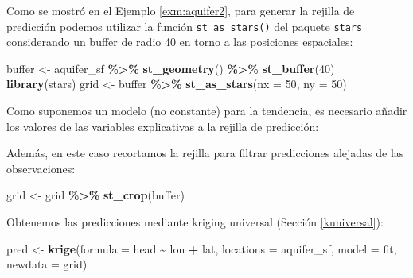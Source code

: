 \documentclass[
]{book}
\newenvironment{Shaded}{\begin{snugshade}}{\end{snugshade}}
\newcommand{\AttributeTok}[1]{\textcolor[rgb]{0.13,0.29,0.53}{#1}}
\newcommand{\DecValTok}[1]{\textcolor[rgb]{0.00,0.00,0.81}{#1}}
\newcommand{\FunctionTok}[1]{\textcolor[rgb]{0.13,0.29,0.53}{\textbf{#1}}}
\newcommand{\NormalTok}[1]{#1}
\newcommand{\OtherTok}[1]{\textcolor[rgb]{0.56,0.35,0.01}{#1}}
\newcommand{\SpecialCharTok}[1]{\textcolor[rgb]{0.81,0.36,0.00}{\textbf{#1}}}
\theoremstyle{break}
\theoremstyle{definition}
\theoremstyle{definition}
\theoremstyle{definition}
\theoremstyle{definition}
\theoremstyle{remark}
\begin{document}
Como se mostró en el Ejemplo \ref{exm:aquifer2}, para generar la rejilla de predicción podemos utilizar la función \texttt{st\_as\_stars()} del paquete \texttt{stars} considerando un buffer de radio 40 en torno a las posiciones espaciales:

\begin{Shaded}
\begin{Highlighting}[]
\NormalTok{buffer }\OtherTok{\textless{}{-}}\NormalTok{ aquifer\_sf }\SpecialCharTok{\%\textgreater{}\%} \FunctionTok{st\_geometry}\NormalTok{() }\SpecialCharTok{\%\textgreater{}\%} \FunctionTok{st\_buffer}\NormalTok{(}\DecValTok{40}\NormalTok{)}
\FunctionTok{library}\NormalTok{(stars)}
\NormalTok{grid }\OtherTok{\textless{}{-}}\NormalTok{ buffer }\SpecialCharTok{\%\textgreater{}\%}  \FunctionTok{st\_as\_stars}\NormalTok{(}\AttributeTok{nx =} \DecValTok{50}\NormalTok{, }\AttributeTok{ny =} \DecValTok{50}\NormalTok{)}
\end{Highlighting}
\end{Shaded}

Como suponemos un modelo (no constante) para la tendencia, es necesario añadir los valores de las variables explicativas a la rejilla de predicción:

\begin{Shaded}
\end{Shaded}

Además, en este caso recortamos la rejilla para filtrar predicciones alejadas de las observaciones:

\begin{Shaded}
\begin{Highlighting}[]
\NormalTok{grid }\OtherTok{\textless{}{-}}\NormalTok{ grid }\SpecialCharTok{\%\textgreater{}\%} \FunctionTok{st\_crop}\NormalTok{(buffer)}
\end{Highlighting}
\end{Shaded}

Obtenemos las predicciones mediante kriging universal (Sección \ref{kuniversal}):

\begin{Shaded}
\begin{Highlighting}[]
\NormalTok{pred }\OtherTok{\textless{}{-}} \FunctionTok{krige}\NormalTok{(}\AttributeTok{formula =}\NormalTok{ head }\SpecialCharTok{\textasciitilde{}}\NormalTok{ lon }\SpecialCharTok{+}\NormalTok{ lat, }\AttributeTok{locations =}\NormalTok{ aquifer\_sf, }\AttributeTok{model =}\NormalTok{ fit,}
              \AttributeTok{newdata =}\NormalTok{ grid)}
\end{Highlighting}
\end{Shaded}
\end{document}
